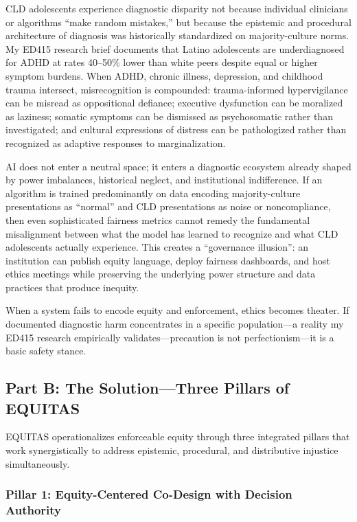 \documentclass[12pt,a4paper]{article}
\begin{document}
CLD adolescents experience diagnostic disparity not because individual clinicians or algorithms ``make random mistakes,'' but because the epistemic and procedural architecture of diagnosis was historically standardized on majority-culture norms.\cite{garcia_ed415} My ED415 research brief documents that Latino adolescents are underdiagnosed for ADHD at rates 40--50\% lower than white peers despite equal or higher symptom burdens.\cite{garcia_ed415} When ADHD, chronic illness, depression, and childhood trauma intersect, misrecognition is compounded: trauma-informed hypervigilance can be misread as oppositional defiance; executive dysfunction can be moralized as laziness; somatic symptoms can be dismissed as psychosomatic rather than investigated; and cultural expressions of distress can be pathologized rather than recognized as adaptive responses to marginalization.\cite{garcia_ed415}

AI does not enter a neutral space; it enters a diagnostic ecosystem already shaped by power imbalances, historical neglect, and institutional indifference. If an algorithm is trained predominantly on data encoding majority-culture presentations as ``normal'' and CLD presentations as noise or noncompliance, then even sophisticated fairness metrics cannot remedy the fundamental misalignment between what the model has learned to recognize and what CLD adolescents actually experience.\cite{marko2025} This creates a ``governance illusion'': an institution can publish equity language, deploy fairness dashboards, and host ethics meetings while preserving the underlying power structure and data practices that produce inequity.\cite{garcia_ed415}

When a system fails to encode equity and enforcement, ethics becomes theater. If documented diagnostic harm concentrates in a specific population—a reality my ED415 research empirically validates—precaution is not perfectionism—it is a basic safety stance.\cite{garcia_ed415}

\subsection{Part B: The Solution—Three Pillars of EQUITAS}

EQUITAS operationalizes enforceable equity through three integrated pillars that work synergistically to address epistemic, procedural, and distributive injustice simultaneously.

\subsubsection{Pillar 1: Equity-Centered Co-Design with Decision Authority}
\end{document}
